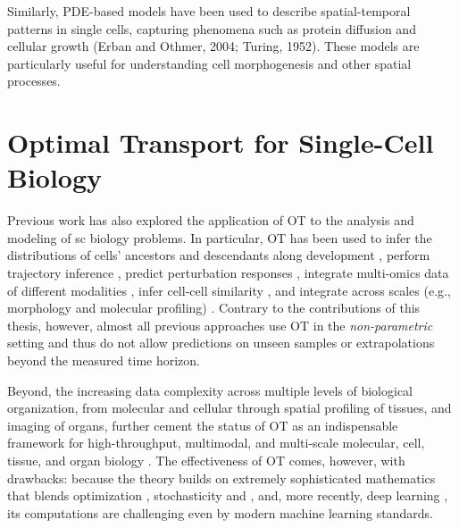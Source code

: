 \citep{fischer2019inferring,hashimoto2016learning,}


Similarly, PDE-based models have been used to describe spatial-temporal patterns in single cells, capturing phenomena such as protein diffusion and cellular growth (Erban and Othmer, 2004; Turing, 1952). These models are particularly useful for understanding cell morphogenesis and other spatial processes.


\section{Optimal Transport for Single-Cell Biology}
\label{sec:ot_for_biology}

Previous work has also explored the application of \acrlong{OT} to the analysis and modeling of \acrlong{sc} biology problems.
In particular, \acrshort{OT} has been used to infer the distributions of cells' ancestors and descendants along development \citep{schiebinger2019optimal}, perform trajectory inference \citep{bunne2022proximal, forrow2021lineageot, bunne2022recovering, lavenant2021towards, schiebinger2019optimal, tong2020trajectorynet, yang2020predicting, zhang2021optimal, chizat2022trajectory}, predict perturbation responses \citep{bunne2021learning, yang2018scalable, lubeck2022neural}, integrate multi-omics data of different modalities \citep{demetci2022scot}, infer cell-cell similarity \citep{huizing2022optimal}, and integrate across scales (e.g., morphology and molecular profiling) \citep{yang2021multi}. 
Contrary to the contributions of this thesis, however, almost all previous approaches use \acrshort{OT} in the \emph{non-parametric} setting and thus do not allow predictions on unseen samples or extrapolations beyond the measured time horizon.

Beyond, the increasing data complexity across multiple levels of biological organization, from molecular and cellular through spatial profiling of tissues, and imaging of organs, further cement the status of \acrshort{OT} as an indispensable framework for high-throughput, multimodal, and multi-scale molecular, cell, tissue, and organ biology \citep{moriel2021novosparc}. The effectiveness of \acrshort{OT} comes, however, with drawbacks: because the theory builds on extremely sophisticated mathematics that blends optimization \citep{cuturi2013sinkhorn, cuturi2022optimal}, stochasticity \citep{chizat2022trajectory, bunne2022recovering} and  \citep{bunne2022proximal}, and, more recently, deep learning \citep{tong2020trajectorynet, bunne2021learning, bunne2022supervised, yang2018scalable, lubeck2022neural, yang2021multi}, its computations are challenging even by modern machine learning standards.
